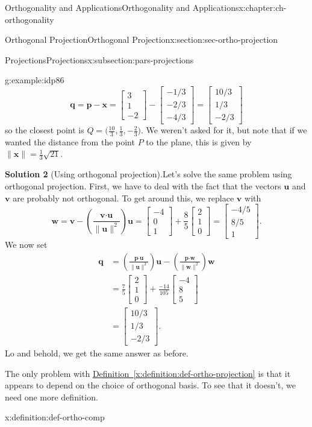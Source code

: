 \documentclass[oneside,10pt,]{book}
\newcommand{\blocktitlefont}{\relax}
\newcommand{\xreffont}{\relax}
\numberwithin{equation}{section}
\newcommand{\bbm}{\begin{bmatrix}}
\newcommand{\ebm}{\end{bmatrix}}
\newcommand{\dotp}{\!\boldsymbol{\cdot}\!}
\newcommand{\len}[1]{\lVert #1\rVert}
\newcommand{\uu}{\mathbf{u}}
\newcommand{\vv}{\mathbf{v}}
\newcommand{\ww}{\mathbf{w}}
\newcommand{\xx}{\mathbf{x}}
\newcommand{\amp}{&}
\begin{document}
\begin{chapterptx}{Orthogonality and Applications}{}{Orthogonality and Applications}{}{}{x:chapter:ch-orthogonality}
\begin{sectionptx}{Orthogonal Projection}{}{Orthogonal Projection}{}{}{x:section:sec-ortho-projection}
\begin{subsectionptx}{Projections}{}{Projections}{}{}{x:subsection:pars-projections}
\begin{example}{}{g:example:idp86}
\begin{equation*}
\mathbf{q}=\mathbf{p}-\xx=\bbm 3\\1\\-2\ebm-\bbm -1/3\\-2/3\\-4/3\ebm = \bbm 10/3\\1/3\\-2/3\ebm
\end{equation*}
so the closest point is \(Q=\bigl(\frac{10}{3},\frac13,-\frac{2}{3}\bigr)\). We weren't asked for it, but note that if we wanted the distance from the point \(P\) to the plane, this is given by \(\len{\xx}=\frac13\sqrt{21}\).%
\par\smallskip%
\noindent\textbf{\blocktitlefont Solution 2} (Using orthogonal projection).\hypertarget{g:solution:idp88}{}\quad{}Let's solve the same problem using orthogonal projection. First, we have to deal with the fact that the vectors \(\uu\) and \(\vv\) are probably not orthogonal. To get around this, we replace \(\vv\) with%
\begin{equation*}
\ww = \vv-\left(\frac{\vv\dotp\uu}{\len{\uu}^2}\right)\uu = \bbm -4\\0\\1\ebm+\frac 85\bbm 2\\1\\0\ebm = \bbm -4/5\\8/5\\1\ebm\text{.}
\end{equation*}
We now set%
\begin{align*}
\mathbf{q} \amp =\left(\frac{\mathbf{p}\dotp\uu}{\len{\uu}^2}\right)\uu-\left(\frac{\mathbf{p}\dotp\ww}{\len{\ww}^2}\right)\ww\\
\amp = \frac{7}{5}\bbm 2\\1\\0\ebm +\frac{-14}{105}\bbm -4\\8\\5\ebm \\
\amp = \bbm 10/3\\1/3\\-2/3\ebm\text{.}
\end{align*}
Lo and behold, we get the same answer as before.%
\end{example}
The only problem with \hyperref[x:definition:def-ortho-projection]{Definition~{\xreffont\ref{x:definition:def-ortho-projection}}} is that it appears to depend on the choice of orthogonal basis. To see that it doesn't, we need one more definition.%
\begin{definition}{}{x:definition:def-ortho-comp}%

\end{definition}
\end{subsectionptx}
\end{sectionptx}
\end{chapterptx}
\end{document}
